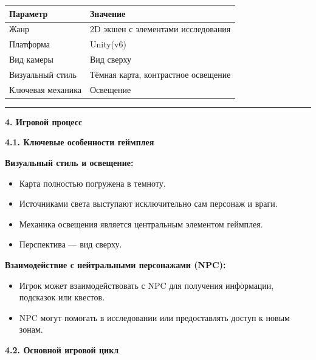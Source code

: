 \documentclass[
]{article}
\begin{document}
\begin{longtable}[]{@{}
  >{\raggedright\arraybackslash}p{}
  >{\raggedright\arraybackslash}p{}@{}}
\toprule\noalign{}
\begin{minipage}[b]{\linewidth}\raggedright
Параметр
\end{minipage} & \begin{minipage}[b]{\linewidth}\raggedright
Значение
\end{minipage} \\
\midrule\noalign{}
\endhead
\bottomrule\noalign{}
\endlastfoot
Жанр & 2D экшен с элементами исследования \\
Платформа & Unity(v6) \\
Вид камеры & Вид сверху \\
Визуальный стиль & Тёмная карта, контрастное освещение \\
Ключевая механика & Освещение \\
\end{longtable}

\begin{center}\rule{0.5\linewidth}{0.5pt}\end{center}

\textbf{4. Игровой процесс}

\textbf{4.1. Ключевые особенности геймплея}

\textbf{Визуальный стиль и освещение:}

\begin{itemize}
\item
  Карта полностью погружена в темноту.
\item
  Источниками света выступают исключительно сам персонаж и враги.
\item
  Механика освещения является центральным элементом геймплея.
\item
  Перспектива --- вид сверху.
\end{itemize}

\textbf{Взаимодействие с нейтральными персонажами (NPC):}

\begin{itemize}
\item
  Игрок может взаимодействовать с NPC для получения информации,
  подсказок или квестов.
\item
  NPC могут помогать в исследовании или предоставлять доступ к новым
  зонам.
\end{itemize}

\textbf{4.2. Основной игровой цикл}
\end{document}
